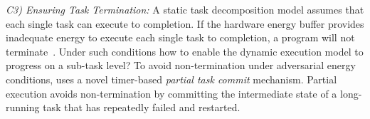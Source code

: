 \noindent\emph{C3) Ensuring Task Termination:} A static task decomposition model assumes that each
single task can execute to completion. If the hardware energy buffer provides
inadequate energy to execute each single task to completion, a program will not
terminate~\cite{cleancut_2018}. Under such conditions how to enable the dynamic execution model to progress on a sub-task level? To avoid non-termination under adversarial
energy conditions, \sys uses a novel timer-based {\em partial task commit} mechanism.
Partial execution avoids non-termination by committing the intermediate state of a long-running
task that has repeatedly failed and restarted.

%

